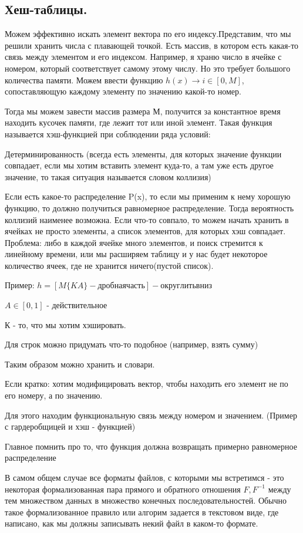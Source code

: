 \documentclass[a4paper, 12pt]{article}
\begin{document}
	\subsection*{Хеш-таблицы.}
	
	Можем эффективно искать элемент вектора по его индексу.Представим, что мы решили хранить числа с плавающей точкой. Есть массив, в котором есть какая-то связь между элементом и его индексом. Например, я храню число в ячейке с номером, который соответствует самому этому числу. Но это требует большого количества памяти.
	Можем ввести функцию $h(x) \rightarrow i \in [0, M]$, сопоставляющую каждому элементу по значению какой-то номер.
	
	Тогда мы можем завести массив размера М, получится за константное время находить кусочек памяти, где лежит тот или иной элемент. Такая функция называется хэш-функцией при соблюдении ряда условий:
	
	Детерминированность (всегда есть элементы, для которых значение функции совпадает, если мы хотим вставить элемент куда-то, а  там уже есть другое значение, то такая ситуация называется словом коллизия)
	
	Если есть какое-то распределение P(x), то если мы применим к нему хорошую функцию, то должно получиться равномерное распределение. Тогда вероятность коллизий наименее возможна. Если что-то совпало, то можем начать хранить в ячейках не просто элементы, а список элементов, для которых хэш совпадает. Проблема: либо в каждой ячейке много элементов, и поиск стремится к линейному времени, или мы расширяем таблицу и у нас будет некоторое количество ячеек, где не хранится ничего(пустой список). 
	
	Пример: $h = [M\{KA\} - дробная часть] - округлить вниз$
	
	$A\in [0, 1]$ - действительное
	
	К - то, что мы хотим хэшировать.
	
	Для строк можно придумать что-то подобное (например, взять сумму)
	
	Таким образом можно хранить и словари.
	
	Если кратко: хотим модифицировать вектор, чтобы находить его элемент не по его номеру, а по значению. 
	
	Для этого находим функциональную связь между номером и значением. (Пример с гардеробщицей и хэш - функцией)
	
	Главное помнить про то, что функция должна возвращать примерно равномерное распределение
	
	
	В самом общем случае все форматы файлов, с которыми мы встретимся - это некоторая формализованная пара прямого и обратного отношения $F, F^{-1}$ между тем множеством данных в множество конечных последовательностей.
	Обычно такое формализованное правило или алгорим задается в текстовом виде, где написано, как мы должны записывать некий файл в каком-то формате.
	
\end{document}
